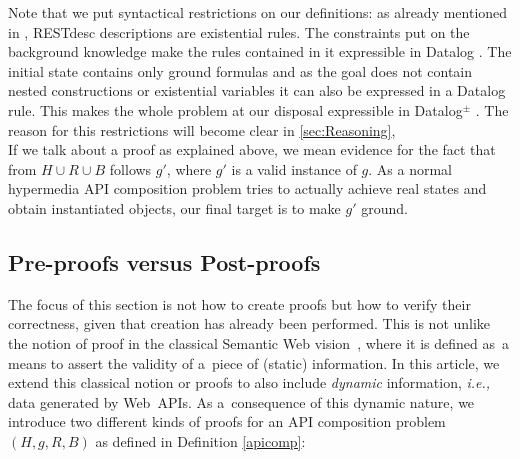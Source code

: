 Note that we put syntactical restrictions on our definitions: as already mentioned in , RESTdesc descriptions are
existential rules. The constraints put on the background knowledge make the rules contained in it expressible in Datalog \cite{datalog}. The initial state
contains only ground formulas and as the goal does not contain nested constructions or existential variables it can also be expressed in a Datalog rule.
This makes the whole problem at our disposal expressible in Datalog$^\pm$ \cite{datalogpm}. The reason for this restrictions 
will become clear in \cref{sec:Reasoning},
\\
If we talk about a proof as explained above, we mean evidence for the fact that
from $H\cup R \cup B$ follows $g'$, where $g'$ is a valid instance of $g$. 
As a normal hypermedia API composition problem tries to actually achieve real states
and obtain instantiated objects, our final target is to make $g'$ ground.

\subsection{Pre-proofs versus Post-proofs}
\label{sec:PrePostProof}
The focus of this section is not how to create proofs
but how to verify their correctness,
given that creation has already been performed.
This is not unlike the notion of proof in the classical Semantic Web vision~\cite{SemanticWeb},
where it is defined as~a means to assert the validity of a~piece of (static) information.
In this article, we extend this classical notion or proofs
to also include \emph{dynamic} information,
{\it i.e.,} data generated by Web~APIs.
As a~consequence of this dynamic nature,
we introduce two different kinds of proofs for an API composition problem $(H, g, R, B)$ as defined in Definition \ref{apicomp}:


